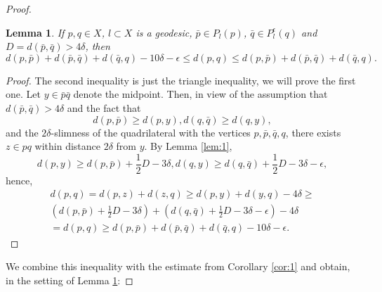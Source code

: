 \documentclass[12pt]{amsbook}%
\newtheorem{lem}[thm]{Lemma}
\theoremstyle{definition}
\theoremstyle{remark}
\numberwithin{section}{chapter}
\numberwithin{subsection}{section}
\numberwithin{figure}{chapter}
\def\half{\frac{1}{2}}
\def\eps{\epsilon}
\begin{document}
{{\begin{proof}
\begin{lem}\label{lem:B1}
If $p, q\in X$, $l\subset X$ is a geodesic, $\bar{p}\in P_l(p)$, $\bar{q}\in P^\eps_l(q)$ and $D=d(\bar{p}, \bar{q})> 4\delta$, then 
$$
d(p, \bar{p}) + d(\bar{p}, \bar{q}) + d(\bar{q}, q)-10\delta-\eps \leqslant d(p,q)\leqslant d(p, \bar{p}) + d(\bar{p}, \bar{q}) + d(\bar{q}, q).
$$
\end{lem}
\begin{proof} The second inequality is just the triangle inequality, we will prove the first one. 
Let $y\in \bar{p} \bar{q}$ denote the midpoint. Then, in view of the assumption that $d(\bar{p}, \bar{q})> 4\delta$ and the fact that
$$
d(p, \bar{p})\geqslant d(p, y), d(q, \bar{q})\geqslant d(q, y),
$$
and the $2\delta$-slimness of the quadrilateral with the vertices $p, \bar{p}, \bar{q}, q$, there exists $z\in pq$ within distance $2\delta$ from $y$.  
By Lemma \ref{lem:1},
$$
d(p, y)\geqslant d(p, \bar{p})+ \half D - 3\delta, d(q, y)\geqslant d(q, \bar{q})+ \half D - 3\delta -\eps,
$$
hence,
\begin{align*}
d(p,q)= d(p,z)+ d(z,q)\geqslant d(p, y) + d(y,q) -4\delta \geqslant \\ 
(d(p, \bar{p})+ \half D - 3\delta) + (d(q, \bar{q})+ \half D - 3\delta-\eps) -4\delta\\ 
= d(p,q)\geqslant d(p, \bar{p}) + d(\bar{p}, \bar{q}) + d(\bar{q}, q) -10\delta-\eps. 
\end{align*}
\end{proof}

We combine this inequality with the estimate from Corollary \ref{cor:1} and obtain, in the setting of Lemma \ref{lem:B1}:


\end{proof}}}
\end{document}
